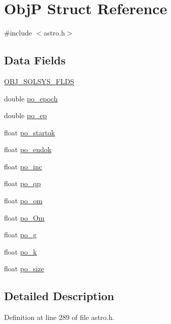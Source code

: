 \hypertarget{struct_obj_p}{\section{Obj\-P Struct Reference}
\label{struct_obj_p}
}


{\ttfamily \#include $<$astro.\-h$>$}

\subsection*{Data Fields}
\begin{DoxyCompactItemize}
\item 
\hyperlink{struct_obj_p_a0968b8e2f9329181eeb4849d07237de3}{O\-B\-J\-\_\-\-S\-O\-L\-S\-Y\-S\-\_\-\-F\-L\-D\-S}
\item 
double \hyperlink{struct_obj_p_a6c13f08ad6241fab117ee292f9bbca95}{po\-\_\-epoch}
\item 
double \hyperlink{struct_obj_p_a1e907a569eee1486b305a03428790303}{po\-\_\-ep}
\item 
float \hyperlink{struct_obj_p_a0132856d9b24cdbcffda2dc90bcf186d}{po\-\_\-startok}
\item 
float \hyperlink{struct_obj_p_a2bbfd945a0f2200354061badc00fc3c4}{po\-\_\-endok}
\item 
float \hyperlink{struct_obj_p_a71353598d3fe9268ce8c899e12b600e1}{po\-\_\-inc}
\item 
float \hyperlink{struct_obj_p_aa20fa9673689c91ce9da43cff2aa9d97}{po\-\_\-qp}
\item 
float \hyperlink{struct_obj_p_a9c8978a19f95ca5c35d7d1c5e8e066a0}{po\-\_\-om}
\item 
float \hyperlink{struct_obj_p_a4c734adac4a3687e537367dadb760404}{po\-\_\-\-Om}
\item 
float \hyperlink{struct_obj_p_a7c7ec666c7ba61378242bb981a2fa757}{po\-\_\-g}
\item 
float \hyperlink{struct_obj_p_a5195b4c594babe171ed9771cf3c2c39c}{po\-\_\-k}
\item 
float \hyperlink{struct_obj_p_aa7fc26e861e24141508546ae5d1a3d68}{po\-\_\-size}
\end{DoxyCompactItemize}


\subsection{Detailed Description}


Definition at line 289 of file astro.\-h.



